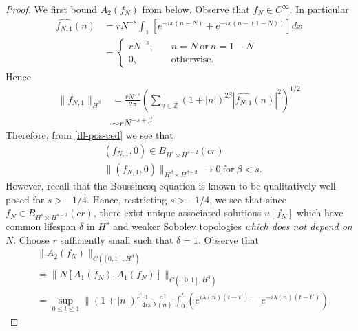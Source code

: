 \documentclass{amsart}
\newcommand{\zz}{\mathbb{Z}}
\newcommand{\ci}{\mathbb{T}}
\newcommand{\wh}{\widehat}
\begin{document}
%
%
%
%
%
%
%
\begin{proof}
  We first bound $A_{2}(f_{N})$ from below.
  Observe that $f_{N} \in C^{\infty}$. In particular
%
%
\begin{equation}
  \label{ill-pos-ce}
\begin{split}
  \wh{f_{N,1}}(n)
  & = r N^{-s}\int_{\ci} [e^{-ix(n - N)} + e^{-ix(n - (1-N))}]  dx  
  \\ 
  & = 
  \begin{cases}
    r N^{-s},  \quad  & n = N \ \text{or} \ n = 1-N
    \\
     0, \quad  & \text{otherwise}.
  \end{cases}
\end{split}
\end{equation}
%
Hence
%
%
\begin{equation}
  \label{ill-pos-ced}
\begin{split}
  \| f_{N,1} \|_{H^{\beta}}
  & = \frac{rN^{-s}}{2 \pi} \left( \sum_{n \in \zz} (1 + | n |)^{2 \beta} |
  \wh{f_{N,1}}(n) |^{2} \right)^{1/2}
  \\
  & \sim rN^{-s + \beta}.
\end{split}
\end{equation}
%
%
Therefore, from \eqref{ill-pos-ced} we see that 
\begin{equation*}
  \begin{split}
    & (f_{N,1}, 0) \in B_{H^{s} \times H^{s-2}}(cr)  
    \\
    & \|(f_{N,1}, 0)\|_{H^{\beta} \times H^{\beta -2}} \to 0 \ \text{for} \ \beta < s.
    \end{split}
\end{equation*}
However, recall that the Boussinesq equation is known to be qualitatively well-posed for $s > -1/4$. Hence, restricting $s > -1/4$, we see that since $f_{N} \in B_{H^{s} \times H^{s-2}}(cr)$, there exist unique associated 
solutions $u[f_{N}]$ which have common lifespan $\delta$ in $H^{s}$ and weaker Sobolev topologies \emph{which does not depend
on $N$}. Choose $r$ sufficiently small such that $\delta =1$.  
Observe that
%
%
\begin{equation*}
\begin{split}
& \| A_{2}(f_{N}) \|_{C([0, 1], H^{\beta})} 
\\
  &  =  \| N[A_{1}(f_{N}), A_{1}(f_{N})] \|_{C([0, 1],
  H^{\beta})} 
  \\
  & = \sup_{0 \le t \le 1} \|  (1 + | n |)^{\beta}
  \frac{1}{4 i \pi} \frac{n^{2}}{\lambda(n)}
  \int_{0}^{t} \left( e^{i\lambda(n)(t-t')} - e^{-i\lambda(n)(t-t')} \right)

\end{split}
\end{equation*}
\end{proof}
\end{document}
